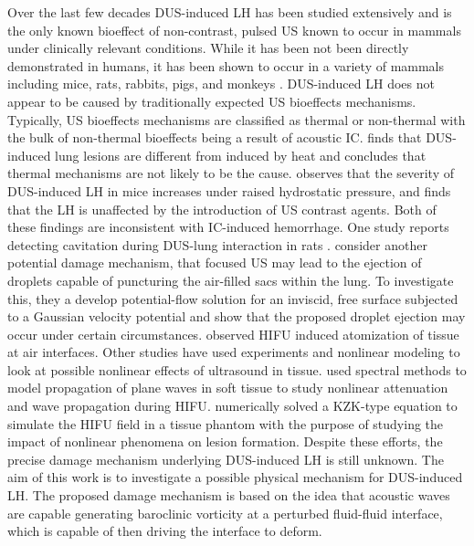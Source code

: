 Over the last few decades \ac{DUS}-induced \ac{LH} has been studied
extensively and is the only known bioeffect of non-contrast, pulsed
\ac{US} known to occur in mammals under clinically relevant
conditions. While it has been not been directly demonstrated in
humans, it has been shown to occur in a variety of mammals including
mice, rats, rabbits, pigs, and monkeys
\citep{Child1990,OBrien2006a,Tarantal1994a,Miller2012}.
\ac{DUS}-induced \ac{LH} does not appear to be caused by traditionally
expected \ac{US} bioeffects mechanisms. Typically, \ac{US} bioeffects
mechanisms are classified as thermal or non-thermal with the bulk of
non-thermal bioeffects being a result of acoustic
\ac{IC}. \cite{Zachary2006} finds that \ac{DUS}-induced lung lesions
are different from induced by heat and concludes that thermal
mechanisms are not likely to be the cause. \cite{OBrien2000} observes
that the severity of \ac{DUS}-induced \ac{LH} in mice increases under
raised hydrostatic pressure, and \cite{Raeman1996} finds that the
\ac{LH} is unaffected by the introduction of \ac{US} contrast
agents. Both of these findings are inconsistent with \ac{IC}-induced
hemorrhage. One study reports detecting cavitation during
\ac{DUS}-lung interaction in rats \cite{Holland1996}. \cite{Tjan2007}
consider another potential damage mechanism, that focused \ac{US} may
lead to the ejection of droplets capable of puncturing the air-filled
sacs within the lung. To investigate this, they a develop
potential-flow solution for an inviscid, free surface subjected to a
Gaussian velocity potential and show that the proposed droplet
ejection may occur under certain circumstances. \cite{Simon2012}
observed \ac{HIFU} induced atomization of tissue at air
interfaces. Other studies have used experiments and nonlinear modeling
to look at possible nonlinear effects of ultrasound in
tissue. \cite{Khokhlova1997} used spectral methods to model
propagation of plane waves in soft tissue to study nonlinear
attenuation and wave propagation during
\ac{HIFU}. \cite{Khokhlova2006} numerically solved a KZK-type equation
to simulate the \ac{HIFU} field in a tissue phantom with the purpose
of studying the impact of nonlinear phenomena on lesion formation.
Despite these efforts, the precise damage mechanism underlying
\ac{DUS}-induced \ac{LH} is still unknown. The aim of this work is to
investigate a possible physical mechanism for \ac{DUS}-induced
\ac{LH}. The proposed damage mechanism is based on the idea that
acoustic waves are capable generating baroclinic vorticity at a
perturbed fluid-fluid interface, which is capable of then driving the
interface to deform.


